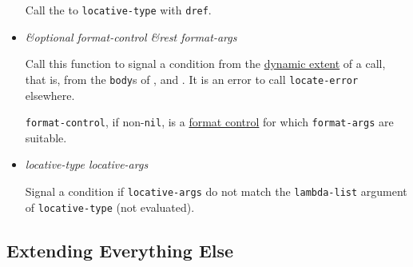 \begin{itemize}
  Call the
  to \texttt{locative-type} with \texttt{dref}.
\item
  \label{x-28DREF-EXT-3ALOCATE-ERROR-20FUNCTION-29}
  \emph{\&optional format-control \&rest format-args}

  Call this function to signal a
  condition from the
  \href{http://www.lispworks.com/documentation/HyperSpec/Body/26_glo_d.htm\#dynamic_extent}{dynamic
  extent} of a
   call, that
  is, from the \texttt{body}s of
  ,
  and
  .
  It is an error to call \texttt{locate-error} elsewhere.

  \texttt{format-control}, if non-\texttt{nil}, is a
  \href{http://www.lispworks.com/documentation/HyperSpec/Body/26_glo_f.htm\#format_control}{format
  control} for which \texttt{format-args} are suitable.
\item
  \label{x-28DREF-EXT-3ACHECK-LOCATIVE-ARGS-20MGL-PAX-3AMACRO-29}
  \emph{locative-type locative-args}

  Signal a
  condition if \texttt{locative-args} do not match the
  \texttt{lambda-list} argument of \texttt{locative-type} (not
  evaluated).
\end{itemize}

\subsection{Extending Everything Else}\label{extending-everything-else}

\label{x-28DREF-EXT-3A-40EXTENDING-EVERYTHING-ELSE-20MGL-PAX-3ASECTION-29}

